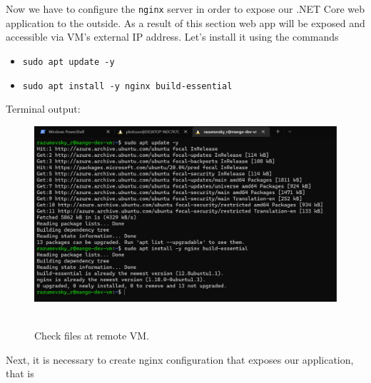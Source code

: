 Now we have to configure the \texttt{nginx} server in order to expose our .NET Core web application to the outside.
As a result of this section web app will be exposed and accessible via VM's external IP address.
Let's install it using the commands
\begin{itemize}
    \item \texttt{sudo apt update -y}
    \item \texttt{sudo apt install -y nginx build-essential}
\end{itemize}
Terminal output:
\begin{figure}[H]
    \centering
    \includegraphics[width=1\textwidth]{img/06_install_nginx}
    ~\caption{Check files at remote VM.}\label{fig:figure15}
\end{figure}
Next, it is necessary to create nginx configuration that exposes our application, that is
